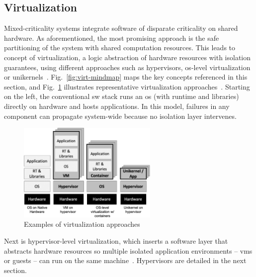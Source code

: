 \subsection{Virtualization}%
\label{sec:virtualization}
Mixed-criticality systems integrate software of disparate criticality on shared hardware.
As aforementioned,
the most promising approach is the safe partitioning of the system with shared
computation resources. This leads to concept of virtualization, a logic
abstraction of hardware resources with isolation guarantees, using different approaches such as
hypervisors, \gls{os}-level virtualization or unikernels~\cite{cinque2022virtualizing}.
%
Fig.~\ref{fig:virt-mindmap} maps the key concepts referenced in this section,
and Fig.~\ref{fig:virt-approaches-exs} illustrates representative virtualization
approaches~\cite{cinque2022virtualizing}. Starting on the left, the conventional
\gls{sw} stack runs an \gls{os} (with runtime and libraries) directly on
hardware and hosts applications. In this model, failures in any component can
propagate system-wide because no isolation layer intervenes.

\begin{figure}[!hbtp]
  \centering
  \includegraphics[width=0.6\textwidth]{./img/jpg/virt-approaches-exs} 
%   
  \caption[Examples of virtualization approaches]{Examples of virtualization approaches~\cite{cinque2022virtualizing}\footnotemark}%
  \label{fig:virt-approaches-exs}
\end{figure}
%
%

Next is hypervisor-level virtualization, which inserts a software layer that
abstracts hardware resources so multiple isolated application
environments -- \glspl{vm} or guests -- can run on the same
machine~\cite{cinque2022virtualizing}. Hypervisors are detailed in the next
section.

